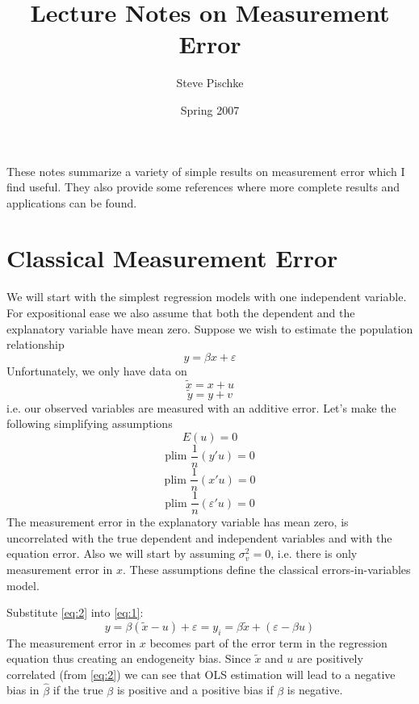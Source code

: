 \documentclass[12pt]{article}
\title{Lecture Notes on Measurement Error}
\author{Steve Pischke}
\date{Spring 2007}
\begin{document}
\maketitle
These notes summarize a variety of simple results on measurement error which I find useful. They also provide some references where more complete results and applications can be found.
\section*{Classical Measurement Error}
We will start with the simplest regression models with one independent variable. For expositional ease we also assume that both the dependent and the explanatory variable have mean zero. Suppose we wish to estimate the population relationship
\begin{equation}
\label{eq:1}
y = \beta x + \varepsilon
\end{equation}
Unfortunately, we only have data on
\begin{equation}
\label{eq:2}
\tilde{x} = x + u
\end{equation}
\begin{equation}
\label{eq:3}
\tilde{y} = y + v
\end{equation}
i.e. our observed variables are measured with an additive error. Let's make the following simplifying assumptions
\begin{equation}
\label{eq:4}
E(u) = 0
\end{equation}
\begin{equation}
\label{eq:5}
\text{plim } \frac{1}{n}(y'u) = 0
\end{equation}
\begin{equation}
\label{eq:6}
\text{plim } \frac{1}{n}(x'u) = 0
\end{equation}
\begin{equation}
\label{eq:7}
\text{plim } \frac{1}{n}(\varepsilon'u) = 0
\end{equation}
The measurement error in the explanatory variable has mean zero, is uncorrelated with the true dependent and independent variables and with the equation error. Also we will start by assuming $\sigma_v^2 = 0$, i.e. there is only measurement error in $x$. These assumptions define the classical errors-in-variables model.

Substitute \eqref{eq:2} into \eqref{eq:1}:
\begin{equation}
\label{eq:8}
y = \beta(\tilde{x} - u) + \varepsilon = y_i = \beta \tilde{x} + (\varepsilon - \beta u)
\end{equation}
The measurement error in $x$ becomes part of the error term in the regression equation thus creating an endogeneity bias. Since $\tilde{x}$ and $u$ are positively correlated (from \eqref{eq:2}) we can see that OLS estimation will lead to a negative bias in $\hat{\beta}$ if the true $\beta$ is positive and a positive bias if $\beta$ is negative.
\end{document}
